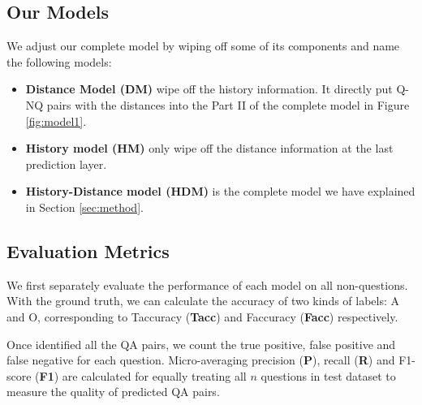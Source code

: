\subsection{Our Models}
We adjust our complete model by wiping off some of its components and name the following models: %
\begin{itemize}
    \item \textbf{Distance Model (DM)} wipe off the history information. It directly put Q-NQ pairs with the distances into the Part II of the complete model in Figure \ref{fig:model1}.
    \item \textbf{History model (HM)} only wipe off the distance information at the last prediction layer.
    \item \textbf{History-Distance model (HDM)} is the complete model we have explained in Section \ref{sec:method}.
    
\end{itemize}


\subsection{Evaluation Metrics}
We first separately evaluate the performance of each model on all non-questions. With the ground truth, we can calculate the accuracy of two kinds of labels: A and O, corresponding to Taccuracy (\textbf{Tacc}) and Faccuracy (\textbf{Facc}) respectively.


Once identified all the QA pairs, we count the true positive, false positive and false negative for each question. Micro-averaging precision (\textbf{P}), recall (\textbf{R}) and F1-score (\textbf{F1}) are calculated for equally treating all $n$ questions in test dataset to measure the quality of predicted QA pairs. 


